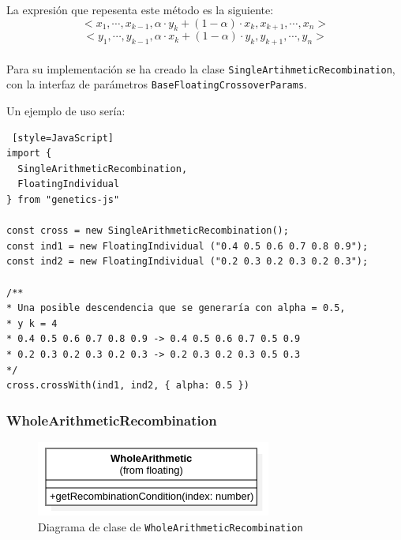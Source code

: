 La expresión que repesenta este método es la siguiente:\\

\begin{equation}
    <x_1, \cdots ,x_{k−1}, \alpha \cdot y_k + (1 - \alpha) \cdot x_k, x_{k+1}, \cdots ,x_n >
\end{equation}
\begin{equation}
    <y_1, \cdots ,y_{k−1}, \alpha \cdot x_k + (1 - \alpha) \cdot y_k, y_{k+1}, \cdots ,y_n >
\end{equation}
\\
Para su implementación se ha creado la clase \texttt{SingleArtihmeticRecombination}, con la interfaz de parámetros \texttt{BaseFloatingCrossoverParams}. \\

\clearpage

Un ejemplo de uso sería: \\

\begin{lstlisting} [style=JavaScript]
import { 
  SingleArithmeticRecombination, 
  FloatingIndividual 
} from "genetics-js"

const cross = new SingleArithmeticRecombination();
const ind1 = new FloatingIndividual ("0.4 0.5 0.6 0.7 0.8 0.9");
const ind2 = new FloatingIndividual ("0.2 0.3 0.2 0.3 0.2 0.3");

/**
* Una posible descendencia que se generaría con alpha = 0.5,
* y k = 4
* 0.4 0.5 0.6 0.7 0.8 0.9 -> 0.4 0.5 0.6 0.7 0.5 0.9
* 0.2 0.3 0.2 0.3 0.2 0.3 -> 0.2 0.3 0.2 0.3 0.5 0.3
*/
cross.crossWith(ind1, ind2, { alpha: 0.5 })
\end{lstlisting}

\subsubsection{WholeArithmeticRecombination}

\begin{figure}[ht]
    \centering
    \includegraphics[scale=0.7]{mem/images/cap-4/4.2.6(Crossover)/WholeArithmetic.png}
    \caption{Diagrama de clase de \texttt{WholeArithmeticRecombination}}
    \label{fig:my_label}
\end{figure}

